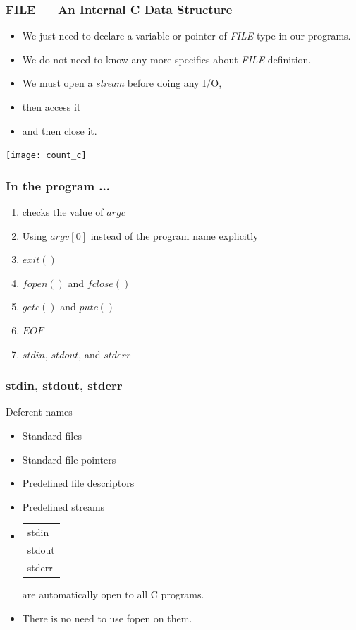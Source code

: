 \documentclass[hyperref={xetex,colorlinks,linkcolor=blue},green,compress]{beamer}
\begin{document}
\begin{frame}\frametitle{FILE --- An Internal C Data Structure}
  \begin{itemize}
  \item We just need to declare a variable or pointer of \emph{FILE} type in our programs.
  \item We do not need to know any more specifics about \emph{FILE} definition.
  \item We must open a \emph{stream} before doing any I/O,
  \item then access it
  \item and then close it.
  \end{itemize}
\end{frame}

\begin{frame}
  \begin{example}
    \texttt{[image: count\_c]}
  \end{example}
\end{frame}

\begin{frame}\frametitle{In the program ...}
  \begin{enumerate}
  \item checks the value of \alert{$argc$}
  \item Using \alert{$argv[0]$} instead of the program name
    explicitly
  \item \alert{$exit()$}
  \item \alert{$fopen()$} and \alert{$fclose()$}
  \item \alert{$getc()$} and \alert{$putc()$}
  \item \alert{$EOF$}
  \item \alert{$stdin$}, \alert{$stdout$}, and \alert{$stderr$}
  \end{enumerate}
\end{frame}

\begin{frame}\frametitle{stdin, stdout, stderr}
  \begin{exampleblock}{Deferent names}
    \begin{itemize}
    \item Standard files
    \item Standard file pointers
    \item Predefined file descriptors
    \item Predefined streams
    \end{itemize}
  \end{exampleblock}
  \begin{itemize}
  \item \begin{tabular}{l}
      stdin\\
      stdout\\
      stderr
    \end{tabular}
    are automatically open to all C programs.
  \item There is no need to use fopen on them.
  \end{itemize}
\end{frame}
\end{document}
